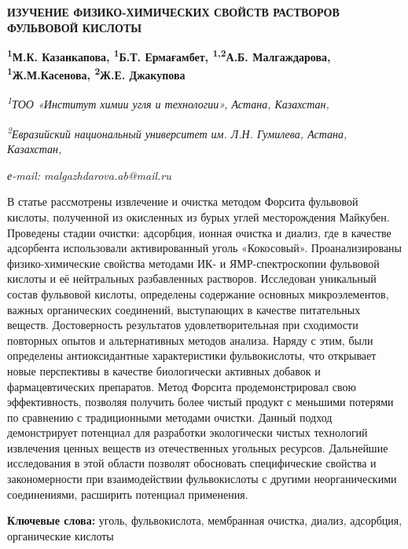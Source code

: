 \begin{articleheader}
{\bfseries ИЗУЧЕНИЕ ФИЗИКО-ХИМИЧЕСКИХ СВОЙСТВ РАСТВОРОВ ФУЛЬВОВОЙ КИСЛОТЫ}

{\bfseries
\textsuperscript{1}М.К. Казанкапова,
\textsuperscript{1}Б.Т. Ермағамбет,
\textsuperscript{1,2}А.Б. Малгаждарова\textsuperscript{\envelope },
\textsuperscript{1}Ж.М.Касенова,
\textsuperscript{2}Ж.Е. Джакупова}
\end{articleheader}

\begin{affiliation}
\emph{\textsuperscript{1}ТОО «Институт химии угля и технологии», Астана,
Казахстан,}

\emph{\textsuperscript{2}Евразийский национальный университет им. Л.Н.
Гумилева, Астана, Казахстан,}

\emph{е-mail: malgazhdarova.ab@mail.ru}
\end{affiliation}

В статье рассмотрены извлечение и очистка методом Форсита фульвовой
кислоты, полученной из окисленных из бурых углей месторождения Майкубен.
Проведены стадии очистки: адсорбция, ионная очистка и диализ, где в
качестве адсорбента использовали активированный уголь «Кокосовый».
Проанализированы физико-химические свойства методами ИК- и
ЯМР-спектроскопии фульвовой кислоты и её нейтральных разбавленных
растворов. Исследован уникальный состав фульвовой кислоты, определены
содержание основных микроэлементов, важных органических соединений,
выступающих в качестве питательных веществ. Достоверность результатов
удовлетворительная при сходимости повторных опытов и альтернативных
методов анализа. Наряду с этим, были определены антиоксидантные
характеристики фульвокислоты, что открывает новые перспективы в качестве
биологически активных добавок и фармацевтических препаратов. Метод
Форсита продемонстрировал свою эффективность, позволяя получить более
чистый продукт с меньшими потерями по сравнению с традиционными методами
очистки. Данный подход демонстрирует потенциал для разработки
экологически чистых технологий извлечения ценных веществ из
отечественных угольных ресурсов. Дальнейшие исследования в этой области
позволят обосновать специфические свойства и закономерности при
взаимодействии фульвокислоты с другими неорганическими соединениями,
расширить потенциал применения.

{\bfseries Ключевые слова:} уголь, фульвокислота, мембранная очистка,
диализ, адсорбция, органические кислоты

